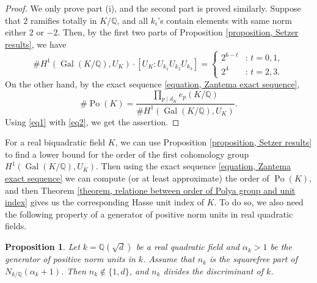 \documentclass{jams-l}
\newtheorem{proposition}[theorem]{Proposition}
\theoremstyle{definition}
\theoremstyle{remark}
\numberwithin{equation}{section}
\DeclareMathOperator{\Po}{Po}
\DeclareMathOperator{\Gal}{Gal}
\begin{document}
\begin{proof}
We only prove part (i), and the second part is proved similarly. Suppose that $2$ ramifies totally in $K/\mathbb{Q}$, and all $k_i$'s contain elements with same norm either $2$ or $-2$. Then, by the first two parts of Proposition \ref{proposition, Setzer results}, we have
\begin{equation} \label{eq1}
\# H^1(\Gal(K/\mathbb{Q}),U_K) \cdot \left[ U_K : U_{k_1} U_{k_2} U_{k_3}\right]=
 \begin{cases}
		2^{6-t}              & : \,  t =0,1, \\ 
		2^{4}            & : \,  t=2,3.
	\end{cases}
\end{equation}
On the other hand, by the exact sequence \eqref{equation, Zantema exact sequence}, 
\begin{equation} \label{eq2}
	\# \Po(K)=\frac{\prod_{p \mid d_K}e_p(K/\mathbb{Q})}{\# H^1(\Gal(K/\mathbb{Q}),U_K)}.
\end{equation}
Using \eqref{eq1} with \eqref{eq2}, we get the assertion.

\end{proof}

For a real biquadratic field $K$, we can use Proposition \eqref{proposition, Setzer results} to find a lower bound for the order of the first cohomology group $H^1(\Gal(K/\mathbb{Q}),U_K)$. Then using the exact sequence \eqref{equation, Zantema exact sequence} we can compute (or at least approximate) the order of $\Po(K)$, and then Theorem \eqref{theorem, relatione between order of Polya group and unit index} gives us  the corresponding Hasse unit index of $K$. To do so, we also need the following property of a generator of positive norm units in real quadratic fields.


\begin{proposition} \cite{MaarefJNT2021} \label{proposition, properties of m_k}
	Let $k=\mathbb{Q}(\sqrt{d})$ be a real quadratic field and $\alpha_k >1$ be the generator of positive norm units in $k$. Assume that $n_k$ is the squarefree part of $N_{k/\mathbb{Q}}(\alpha_{k}+1)$. Then $n_k \not \in \{ 1,d\}$, and $n_k$ divides the discriminant of $k$.
\end{proposition}
\end{document}
